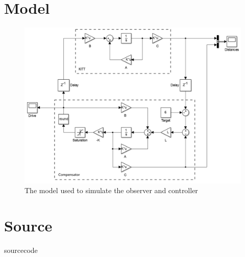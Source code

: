 \documentclass[final]{scrreprt} %
\begin{document}
\begin{appendices}
\chapter{Model}
\label{app:model}
\begin{figure}[H]
	\centering    	
    	\includegraphics[width=\textwidth]{resources/model.png}
    	\caption{The model used to simulate the observer and controller}
    	\label{app:model}
\end{figure}

\chapter{Source}
\label{app:source}
{sourcecode}

\end{appendices}
\end{document}
